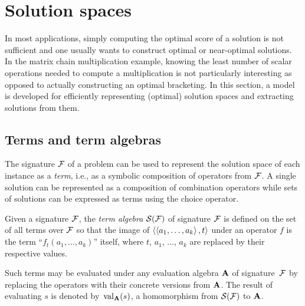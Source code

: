 
\section{Solution spaces}\label{sec:adp:solution-spaces}

In most applications, simply computing the optimal score of a solution is not sufficient and one usually wants to construct optimal or near-optimal solutions.
In the matrix chain multiplication example, knowing the least number of scalar operations needed to compute a multiplication is not particularly interesting as opposed to actually constructing an optimal bracketing.
In this section, a model is developed for efficiently representing (optimal) solution spaces and extracting solutions from them.

\subsection{Terms and term algebras}

The signature \(\mathcal{F}\) of a problem can be used to represent the solution space of each instance as a \emph{term}, i.e., as a symbolic composition of operators from \(\mathcal{F}\).
A single solution can be represented as a composition of combination operators while sets of solutions can be expressed as terms using the choice operator.

\begin{definition}
    Given a signature \(\mathcal{F}\), the \emph{term algebra} \(\mathcal{S}(\mathcal{F})\) of signature \(\mathcal{F}\) is defined on the set of all terms over \(\mathcal{F}\) so that the image of \(\left\langle\left\langle a_1, \ldots, a_k\right\rangle, t\right\rangle\) under an operator \(f\) is the term \enquote{\(f_t(a_1, \ldots, a_k)\)} itself, where \(t\), \(a_1\), ..., \(a_k\) are replaced by their respective values.

    Such terms may be evaluated under any evaluation algebra \(\mathbf{A}\) of signature~\(\mathcal{F}\) by replacing the operators with their concrete versions from \(\mathbf{A}\).
    The result of evaluating \(s\) is denoted by~\(\operatorname{val}_{\mathbf{A}}(s)\), a homomorphism from \(\mathcal{S}(\mathcal{F})\) to \(\mathbf{A}\).
\end{definition}


